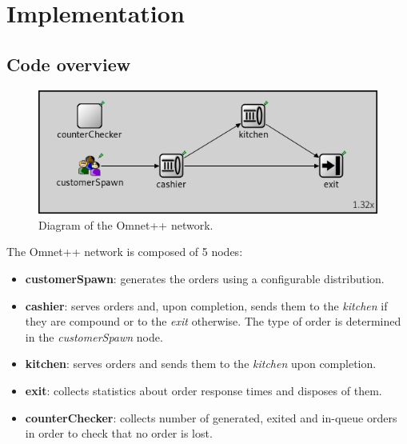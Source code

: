 \section{Implementation}

\subsection{Code overview}

\begin{figure}[h!]
    \centering
    \includegraphics[width=.75\textwidth]{figs/omnet_network.png}
    \caption{Diagram of the Omnet++ network.}
    \label{fig:omnet_network}
\end{figure}

The Omnet++ network is composed of 5 nodes:
\begin{itemize}
    \item \textbf{customerSpawn}: generates the orders using a configurable
        distribution.
    \item \textbf{cashier}: serves orders and, upon completion, sends them to 
        the \emph{kitchen} if they are compound or to the \emph{exit} otherwise.
        The type of order is determined in the \emph{customerSpawn} node.
    \item \textbf{kitchen}: serves orders and sends them to the \emph{kitchen}
        upon completion.
    \item \textbf{exit}: collects statistics about order response times and 
        disposes of them.
    \item \textbf{counterChecker}: collects number of generated, exited and 
        in-queue orders in order to check that no order is lost.
\end{itemize}




